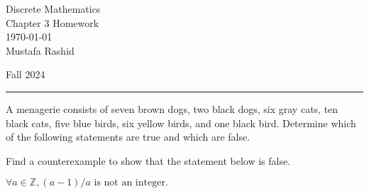 \documentclass[12pt,letterpaper, onecolumn]{exam}
\begin{document}
	
	\begingroup  
	\centering
	\LARGE Discrete Mathematics\\
	\LARGE Chapter 3 Homework\\[0.5em]
	\large \today\\[0.5em]
	\large Mustafa Rashid\par
	\large Fall 2024\par
	\endgroup
	\rule{\textwidth}{0.4pt}
	\pointsdroppedatright
	\printanswers
	\renewcommand{\solutiontitle}{\noindent\textbf{Ans:}\enspace}  
	\begin{questions}
	
	\question  A menagerie consists of seven brown dogs, two black dogs, six gray cats, ten black cats, five blue birds, six yellow birds, and one black bird. Determine which of the following statements are true and which are false.
	\begin{solution}
	\end{solution}
	\question Find a counterexample to show that the statement below is false.\\
		\begin{center}
			$\forall a \in \mathbb{Z}, (a-1)/a \textrm{ is not an integer.}$
		\end{center} 


\end{questions}
\end{document}
